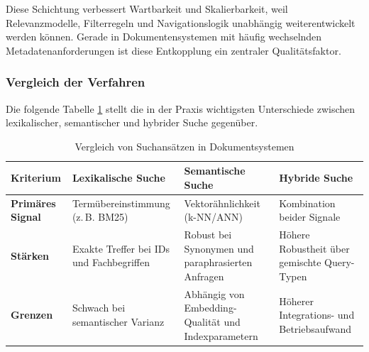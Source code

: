 Diese Schichtung verbessert Wartbarkeit und Skalierbarkeit, weil Relevanzmodelle,
Filterregeln und Navigationslogik unabhängig weiterentwickelt werden können.
Gerade in Dokumentensystemen mit häufig wechselnden Metadatenanforderungen ist
diese Entkopplung ein zentraler Qualitätsfaktor. \cite{elastic_query_filter_context}

\subsubsection{Vergleich der Verfahren}
\label{subsec:vergleich}

Die folgende Tabelle \ref{tab:vergleich_suche} stellt die in der Praxis wichtigsten
Unterschiede zwischen lexikalischer, semantischer und hybrider Suche gegenüber.

\begin{table}[h]
    \centering
    \caption{Vergleich von Suchansätzen in Dokumentsystemen
             \cite{robertson2009bm25,elastic_knn_search,elastic_rrf}}
    \label{tab:vergleich_suche}
    \begin{tabular}{p{3cm} p{4cm} p{4cm} p{3cm}}
        \textbf{Kriterium} &
        \textbf{Lexikalische Suche} &
        \textbf{Semantische Suche} &
        \textbf{Hybride Suche} \\ \hline

        \textbf{Primäres Signal} &
        Termübereinstimmung (z.\,B. BM25) &
        Vektorähnlichkeit (k-NN/ANN) &
        Kombination beider Signale \\ \hline

        \textbf{Stärken} &
        Exakte Treffer bei IDs und Fachbegriffen &
        Robust bei Synonymen und paraphrasierten Anfragen &
        Höhere Robustheit über gemischte Query-Typen \\ \hline

        \textbf{Grenzen} &
        Schwach bei semantischer Varianz &
        Abhängig von Embedding-Qualität und Indexparametern &
        Höherer Integrations- und Betriebsaufwand \\ \hline
    \end{tabular}
\end{table}
